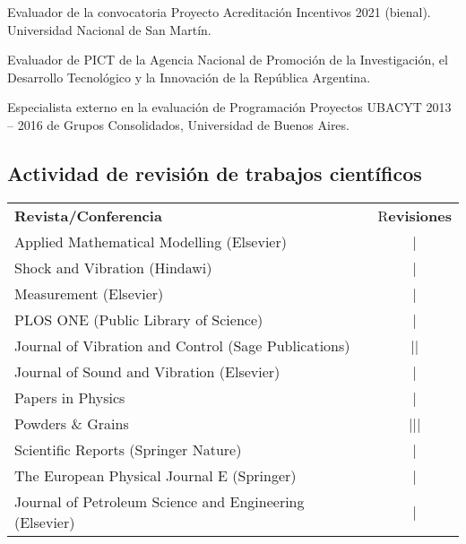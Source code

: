  Evaluador de la convocatoria Proyecto Acreditación Incentivos 2021 (bienal). Universidad Nacional de San Martín.

 Evaluador de PICT de la Agencia Nacional de Promoción de la Investigación, el Desarrollo Tecnológico y la Innovación de la República Argentina.

 Especialista externo en la evaluación de Programación Proyectos UBACYT 2013 -- 2016 de Grupos Consolidados, Universidad de Buenos Aires.

\subsection{Actividad de revisión de trabajos científicos}
\begin{tabular}{l c}
    \textbf{Revista/Conferencia} & R\textbf{evisiones} \\
    Applied Mathematical Modelling (Elsevier) & | \\ 
    Shock and Vibration (Hindawi) &  | \\
    Measurement (Elsevier) &  | \\
    PLOS ONE (Public Library of Science) & | \\
    Journal of Vibration and Control (Sage Publications) & || \\
    Journal of Sound and Vibration (Elsevier) & \cancel{||||} | \\
    Papers in Physics & | \\
    Powders \& Grains & ||| \\
    Scientific Reports (Springer Nature) & | \\
    The European Physical Journal E (Springer) & | \\
    Journal of Petroleum Science and Engineering (Elsevier) & |
\end{tabular}

